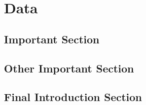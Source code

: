 \chapter[DATA]{Data} \label{chap:data}
\pagestyle{myheadings}

\section{Important Section}\label{sec:data_A}

\kant[3-7]  %
    
\section{Other Important Section}\label{sec:data_B}
    
\kant[8-11]  %

\section{Final Introduction Section}\label{sec:data_C}
    
\kant[12-15]  %

    
%
